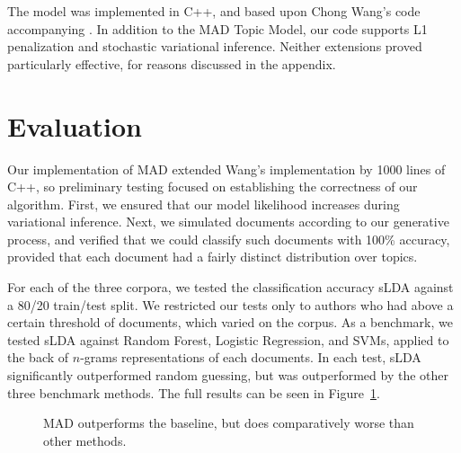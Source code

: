 \documentclass[14pt]{article} %
\theoremstyle{plain}
\theoremstyle{definition}
\theoremstyle{remark}
\begin{document}
The model was implemented in C++, and based upon Chong Wang's code accompanying \cite{wang2009simultaneous}. In addition to the MAD Topic Model, our code supports L1 penalization and stochastic variational inference. Neither extensions proved particularly effective, for reasons discussed in the appendix. 
\section{Evaluation}
Our implementation of MAD extended Wang's implementation by 1000 lines of C++, so preliminary testing focused on establishing the correctness of our algorithm. First, we ensured that our model likelihood increases during variational inference. Next, we simulated documents according to our generative process, and verified that we could classify such documents with 100\% accuracy, provided that each document had a fairly distinct distribution over topics. 

For each of the three corpora, we tested the classification accuracy sLDA against a 80/20 train/test split. We restricted our tests only to authors who had above a certain threshold of documents, which varied on the corpus. As a benchmark, we tested sLDA against Random Forest, Logistic Regression, and SVMs, applied to the back of $n$-grams representations of each documents. In each test, sLDA significantly outperformed random guessing, but was outperformed by the other three benchmark methods. The full results can be seen in Figure~\ref{fig:results}.

\begin{figure}
\centering
{}
\caption{MAD outperforms the baseline, but does comparatively worse than other methods.}
\label{fig:results}
\end{figure}
\end{document}
